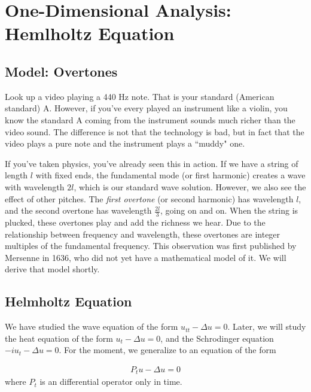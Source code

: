 \documentclass{article}
\begin{document}
	
	\section{One-Dimensional Analysis: Hemlholtz Equation}
	
	\subsection{Model: Overtones}
	
	Look up a video playing a 440 Hz note. That is your standard (American standard) A. However, if you've every played an instrument like a violin, you know the standard A coming from the instrument sounds much richer than the video sound. The difference is not that the technology is bad, but in fact that the video plays a pure note and the instrument plays a ``muddy" one. 
	
	If you've taken physics, you've already seen this in action. If we have a string of length $l$ with fixed ends, the fundamental mode (or first harmonic) creates a wave with wavelength $2l$, which is our standard wave solution. However, we also see the effect of other pitches. The \textit{first overtone} (or second harmonic) has wavelength $l$, and the second overtone has wavelength $\frac{2l}{3}$, going on and on. When the string is plucked, these overtones play and add the richness we hear. Due to the relationship between frequency and wavelength, these overtones are integer multiples of the fundamental frequency. This observation was first published by Mersenne in 1636, who did not yet have a mathematical model of it. We will derive that model shortly. 
	
	
	\subsection{Helmholtz Equation}
	
	We have studied the wave equation of the form $u_{tt} - \Delta u = 0$. Later, we will study the heat equation of the form $u_{t} - \Delta u=0$, and the Schrodinger equation $-iu_{t} - \Delta u =0$. For the moment, we generalize to an equation of the form
	
	\begin{align*}
		P_{t} u -\Delta u = 0
	\end{align*}
	where $P_{t}$ is an differential operator only in time. 
	
\end{document}
